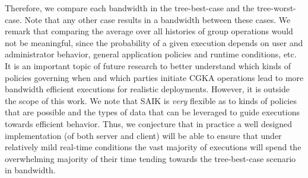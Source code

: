 

Therefore, we compare each bandwidth in the tree-best-case and the tree-worst-case. Note that any other case results in a bandwidth between these cases.
We remark that comparing the average over all histories of group operations would not be meaningful, since the probability of a given execution depends on user and administrator behavior, general application policies and runtime conditions, etc.
It is an important topic of future research to
better understand which kinds of policies governing when and which parties
initiate CGKA operations lead to more bandwidth efficient executions for
realistic deployments. However, it is outside the scope of this work.
%
We note that SAIK is \emph{very} flexible as to kinds of policies that are possible and the types of data that can be leveraged to guide executions towards efficient behavior. Thus, we conjecture that in practice a well designed implementation (of both server and client) will be able to ensure that under relatively mild real-time conditions the vast majority of executions will spend the overwhelming majority of their time tending towards the tree-best-case scenario in bandwidth.


